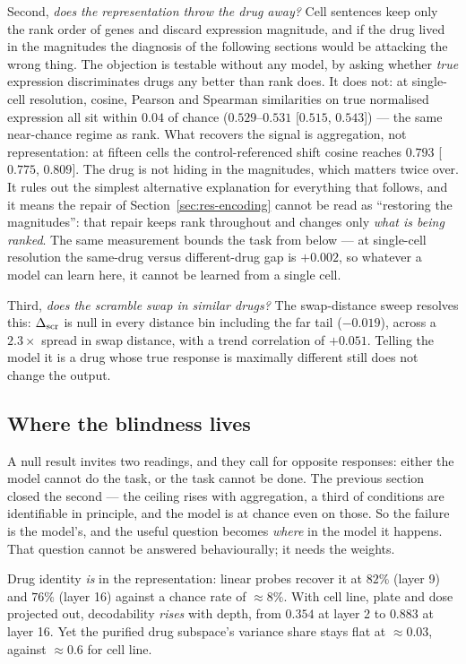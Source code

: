 Second, \emph{does the representation throw the drug away?} Cell sentences keep only the rank order
of genes and discard expression magnitude, and if the drug lived in the magnitudes the diagnosis of
the following sections would be attacking the wrong thing. The objection is testable without any
model, by asking whether \emph{true} expression discriminates drugs any better than rank does. It
does not: at single-cell resolution, cosine, Pearson and Spearman similarities on true normalised
expression all sit within $0.04$ of chance ($0.529$--$0.531$ [$0.515$, $0.543$]) --- the same
near-chance regime as rank. What recovers the signal is aggregation, not representation: at
fifteen cells the control-referenced shift cosine reaches $0.793$ [$0.775$, $0.809$]. The drug is
not hiding in the magnitudes, which matters twice over. It rules out the simplest alternative
explanation for everything that follows, and it means the repair of
Section~\ref{sec:res-encoding} cannot be read as ``restoring the magnitudes'': that repair keeps
rank throughout and changes only \emph{what is being ranked}. The same measurement bounds the task
from below --- at single-cell resolution the same-drug versus different-drug gap is $+0.002$, so
whatever a model can learn here, it cannot be learned from a single cell.

Third, \emph{does the scramble swap in similar drugs?} The swap-distance sweep resolves this:
$\Delta_{\textrm{scr}}$ is null in every distance bin including the far tail ($-0.019$), across a $2.3\times$ spread
in swap distance, with a trend correlation of $+0.051$. Telling the model it is a drug whose true
response is maximally different still does not change the output.

\subsection{Where the blindness lives}
\label{sec:res-mechanism}

A null result invites two readings, and they call for opposite responses: either the model cannot do
the task, or the task cannot be done. The previous section closed the second --- the ceiling rises
with aggregation, a third of conditions are identifiable in principle, and the model is at chance
even on those. So the failure is the model's, and the useful question becomes \emph{where} in the
model it happens. That question cannot be answered behaviourally; it needs the weights.

Drug identity \emph{is} in the representation: linear probes recover it at $82\%$ (layer 9) and
$76\%$ (layer 16) against a chance rate of $\approx 8\%$. With cell line, plate and dose projected
out, decodability \emph{rises} with depth, from $0.354$ at layer 2 to $0.883$ at layer 16. Yet the
purified drug subspace's variance share stays flat at $\approx 0.03$, against $\approx 0.6$ for cell
line.

